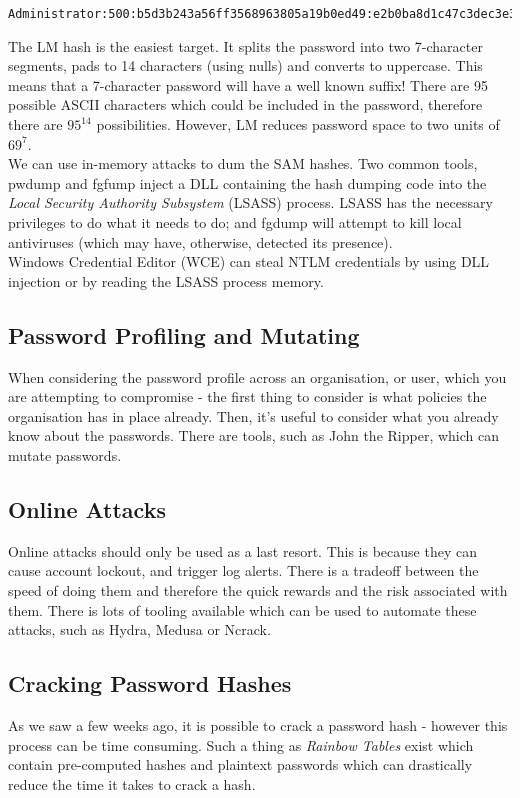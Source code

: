 \begin{verbatim}
Administrator:500:b5d3b243a56ff3568963805a19b0ed49:e2b0ba8d1c47c3dec3e30bd4f61f7398:::

\end{verbatim}

The LM hash is the easiest target. It splits the password into two 7-character segments, pads to 14 characters (using nulls) and converts to uppercase. This means that a 7-character password will have a well known suffix! There are 95 possible ASCII characters which could be included in the password, therefore there are $95^{14}$ possibilities. However, LM reduces password space to two units of $69^7$. \\

We can use in-memory attacks to dum the SAM hashes. Two common tools, pwdump and fgfump inject a DLL containing the hash dumping code into the \textit{Local Security Authority Subsystem} (LSASS) process. LSASS has the necessary privileges to do what it needs to do; and fgdump will attempt to kill local antiviruses (which may have, otherwise, detected its presence).\\

Windows Credential Editor (WCE) can steal NTLM credentials by using DLL injection or by reading the LSASS process memory.

\subsection{Password Profiling and Mutating}
When considering the password profile across an organisation, or user, which you are attempting to compromise - the first thing to consider is what policies the organisation has in place already. Then, it's useful to consider what you already know about the passwords. There are tools, such as John the Ripper, which can mutate passwords.

\subsection{Online Attacks}
Online attacks should only be used as a last resort. This is because they can cause account lockout, and trigger log alerts. There is a tradeoff between the speed of doing them and therefore the quick rewards and the risk associated with them. There is lots of tooling available which can be used to automate these attacks, such as Hydra, Medusa or Ncrack.

\subsection{Cracking Password Hashes}
As we saw a few weeks ago, it is possible to crack a password hash - however this process can be time consuming. Such a thing as \textit{Rainbow Tables} exist which contain pre-computed hashes and plaintext passwords which can drastically reduce the time it takes to crack a hash. 

